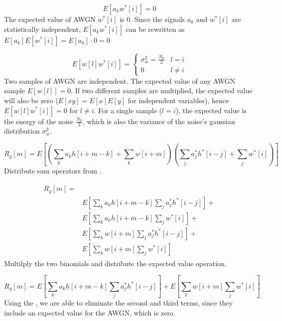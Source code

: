 \documentclass[11pt]{article}
\begin{document}
\begin{equation} \label{enoise_zero}
    E\left[a_k w^*[i]\right]= 0
\end{equation}
The expected value of AWGN $w^*[i]$ is $0$. Since the signals $a_k$ and $w^*[i]$
are statistically independent, $E\left[a_k w^*[i]\right]$ can be rewritten as
$E[a_k]E[w^*[i]] = E[a_k]\cdot 0 = 0$

\begin{equation}\label{noise_e}
    E \left[w[l]w^*[i]\right] =
    \begin{cases}
        \sigma^2_w = \frac{N_0}{2} & l = i    \\
        0                          & l \neq i
    \end{cases}
\end{equation}
Two samples of AWGN are independent. The expected value of any AWGN sample
$E[w[l]] = 0$. If two different samples are multiplied, the expected value will
also be zero ($E[xy] = E[x]E[y]$ for independent variables), hence
$E[w[l]w^*[i]] = 0$ for $l \neq i$. For a single sample ($l = i$), the expected
value is the energy of the noise $\frac{N_0}{2}$, which is also the variance of
the noise's gaussian distribution $\sigma_w^2$.

\begin{equation}
    R_y[m] = E\left[ \left( \sum_k a_k h[i+m-k] + \sum_k w[i+m] \right) \left(
        \sum_j a_j^* h^*[i-j] + \sum_j w^*[i] \right) \right]
\end{equation}
Distribute sum operators from .

\begin{align}
    \begin{split}
        R_y[m] = & \\
        & E\left[ \sum_k a_k h[i+m-k] \sum_j a_j^* h^*[i-j] \right] + \\
        & E\left[ \sum_k a_k h[i+m-k] \sum_j w^*[i] \right] +         \\
        & E\left[ \sum_k w[i+m] \sum_j a_j^* h^*[i-j] \right] +       \\
        & E\left[ \sum_k w[i+m] \sum_j w^*[i] \right]
    \end{split}
\end{align}
Multilply the two binomials and distribute the expected value operation.

\begin{equation}
    R_y[m] = E\left[ \sum_k a_k h[i+m-k] \sum_j a_j^* h^*[i-j] \right] + E\left[
        \sum_k w[i+m] \sum_j w^*[i] \right]
\end{equation}
Using the , we are able to eliminate the second and third
terms, since they include an expected value for the AWGN, which is zero.
\end{document}
